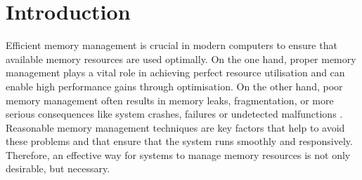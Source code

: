 \chapter{Introduction}
\label{chap:introduction}

Efficient memory management is crucial in modern computers to ensure that available memory resources are used optimally.
On the one hand, proper memory management plays a vital role in achieving perfect resource utilisation and can enable high performance gains through optimisation.
On the other hand, poor memory management often results in memory leaks, fragmentation, or more serious consequences like system crashes, failures or undetected malfunctions \cite{mm-study2016}.
Reasonable memory management techniques are key factors that help to avoid these problems and that ensure that the system runs smoothly and responsively.
Therefore, an effective way for systems to manage memory resources is not only desirable, but necessary.

